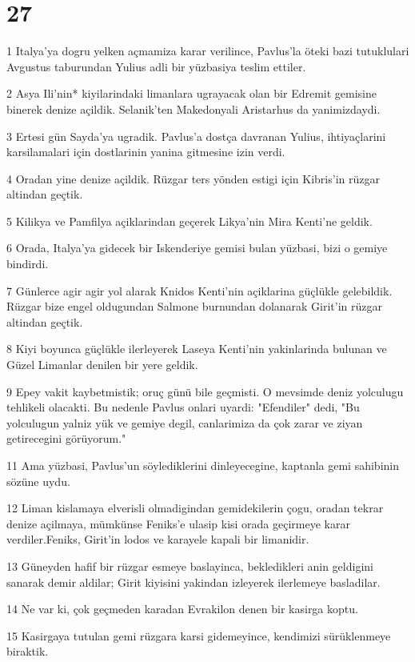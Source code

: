 \chapter{27}

\par 1 Italya'ya dogru yelken açmamiza karar verilince, Pavlus'la öteki bazi tutuklulari Avgustus taburundan Yulius adli bir yüzbasiya teslim ettiler.
\par 2 Asya Ili'nin* kiyilarindaki limanlara ugrayacak olan bir Edremit gemisine binerek denize açildik. Selanik'ten Makedonyali Aristarhus da yanimizdaydi.
\par 3 Ertesi gün Sayda'ya ugradik. Pavlus'a dostça davranan Yulius, ihtiyaçlarini karsilamalari için dostlarinin yanina gitmesine izin verdi.
\par 4 Oradan yine denize açildik. Rüzgar ters yönden estigi için Kibris'in rüzgar altindan geçtik.
\par 5 Kilikya ve Pamfilya açiklarindan geçerek Likya'nin Mira Kenti'ne geldik.
\par 6 Orada, Italya'ya gidecek bir Iskenderiye gemisi bulan yüzbasi, bizi o gemiye bindirdi.
\par 7 Günlerce agir agir yol alarak Knidos Kenti'nin açiklarina güçlükle gelebildik. Rüzgar bize engel oldugundan Salmone burnundan dolanarak Girit'in rüzgar altindan geçtik.
\par 8 Kiyi boyunca güçlükle ilerleyerek Laseya Kenti'nin yakinlarinda bulunan ve Güzel Limanlar denilen bir yere geldik.
\par 9 Epey vakit kaybetmistik; oruç günü bile geçmisti. O mevsimde deniz yolculugu tehlikeli olacakti. Bu nedenle Pavlus onlari uyardi: "Efendiler" dedi, "Bu yolculugun yalniz yük ve gemiye degil, canlarimiza da çok zarar ve ziyan getirecegini görüyorum."
\par 11 Ama yüzbasi, Pavlus'un söylediklerini dinleyecegine, kaptanla gemi sahibinin sözüne uydu.
\par 12 Liman kislamaya elverisli olmadigindan gemidekilerin çogu, oradan tekrar denize açilmaya, mümkünse Feniks'e ulasip kisi orada geçirmeye karar verdiler.Feniks, Girit'in lodos ve karayele kapali bir limanidir.
\par 13 Güneyden hafif bir rüzgar esmeye baslayinca, bekledikleri anin geldigini sanarak demir aldilar; Girit kiyisini yakindan izleyerek ilerlemeye basladilar.
\par 14 Ne var ki, çok geçmeden karadan Evrakilon denen bir kasirga koptu.
\par 15 Kasirgaya tutulan gemi rüzgara karsi gidemeyince, kendimizi sürüklenmeye biraktik.
